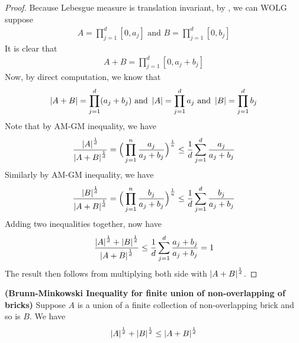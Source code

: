 \documentclass{report}
\begin{document}
\begin{proof}
Because Lebesgue measure is translation invariant, by  , we can WOLG suppose 
\begin{align*}
A=\prod_{j=1}^d [0,a_j]\text{ and }B=\prod_{j=1}^d [0,b_j]
\end{align*}
It is clear that 
\begin{align*}
A+B= \prod_{j=1}^d [0,a_j+b_j]
\end{align*}
Now, by direct computation, we know that 
\begin{align*}
\left|A+B\right|=\prod_{j=1}^d (a_j+b_j)\text{ and }\left|A\right|=\prod_{j=1}^d a_j\text{ and }\left|B\right|=\prod_{j=1}^d b_j
\end{align*}
Note that by AM-GM inequality, we have 
\begin{align*}
\frac{\left|A\right|^{\frac{1}{d}}}{\left|A+B\right|^{\frac{1}{d}}}=\Big(\prod_{j=1}^n \frac{a_j}{a_j+b_j}\Big)^{\frac{1}{n}}\leq \frac{1}{d}\sum_{j=1}^d \frac{a_j}{a_j+b_j}
\end{align*}
Similarly by AM-GM inequality, we have
\begin{align*}
\frac{\left|B\right|^{\frac{1}{d}}}{\left|A+B\right|^{\frac{1}{d}}}=\Big(\prod_{j=1}^n \frac{b_j}{a_j+b_j}\Big)^{\frac{1}{n}}\leq \frac{1}{d}\sum_{j=1}^d \frac{b_j}{a_j+b_j}
\end{align*}
Adding two inequalities together, now have 
\begin{align*}
\frac{\left|A\right|^{\frac{1}{d}}+\left|B\right|^{\frac{1}{d}}}{\left|A+B\right|^{\frac{1}{d}}}\leq \frac{1}{d}\sum_{j=1}^d \frac{a_j+b_j}{a_j+b_j}=1
\end{align*}
The result then follows from multiplying both side with $\left|A+B\right|^{\frac{1}{d}}$. 
\end{proof}
\begin{theorem}
\textbf{(Brunn-Minkowski Inequality for finite union of non-overlapping of bricks)} Suppose $A$ is a union of a finite collection of non-overlapping brick and so is $B$. We have 
 \begin{align*}
\left|A\right|^{\frac{1}{d}}+ \left|B\right|^{\frac{1}{d}}\leq \left|A+B\right|^{\frac{1}{d}}
\end{align*}
\end{theorem}
\end{document}
